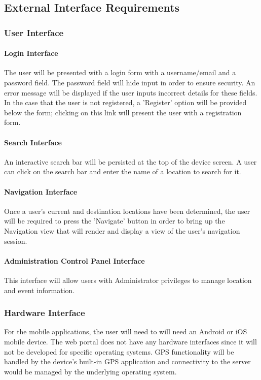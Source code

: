 \subsection{External Interface Requirements}
    \subsubsection{User Interface}
    
        \paragraph{\textbf{Login Interface}}
            The user will be presented with a login form with a username/email and a password field. The password field will hide input in order to ensure security. An error message will be displayed if the user inputs incorrect details for these fields. In the case that the user is not registered, a 'Register' option will be provided below the form; clicking on this link will present the user with a registration form.
    
        \paragraph{\textbf{Search Interface}}
            An interactive search bar will be persisted at the top of the device screen. A user can click on the search bar and enter the name of a location to search for it.
    
        \paragraph{\textbf{Navigation Interface}}
            Once a user's current and destination locations have been determined, the user will be required to press the 'Navigate' button in order to bring up the Navigation view that will render and display a view of the user's navigation session. 
    
        \paragraph{\textbf{Administration Control Panel Interface}}
            This interface will allow users with Administrator privileges to manage location and event information.
    
    \subsubsection{Hardware Interface}
        For the mobile applications, the user will need to will need an Android or iOS mobile device. The web portal does not have any hardware interfaces since it will not be developed for specific operating systems. GPS functionality will be handled by the device's built-in GPS application and connectivity to the server would be managed by the underlying operating system.
        
